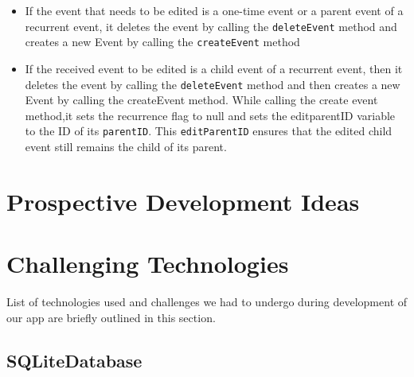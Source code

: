 \documentclass[10pt,a4paper]{report}
\begin{document}
\begin{description}
\begin{itemize}
   \item If the event that needs to be edited is a one-time event or a parent event of a recurrent event, it deletes the event by calling the \texttt{deleteEvent} method and creates a new Event by calling the \texttt{createEvent} method

	\item If the received event to be edited is a child event of a recurrent event, then it deletes the event by calling the \texttt{deleteEvent} method and then creates a new Event by calling the createEvent method. While calling the create event method,it sets the recurrence flag to null and sets the editparentID variable to the ID of its \texttt{parentID}. This \texttt{editParentID} ensures that the edited child event still remains the child of its parent.
   
     
\end{itemize}
   
 \end{description}  
	
 \section{Prospective Development Ideas}
	
 \section{Challenging Technologies}
 List of technologies used and challenges we had to undergo during development of our app are briefly outlined in this section.
  \subsection{SQLiteDatabase}
  
\end{document}
